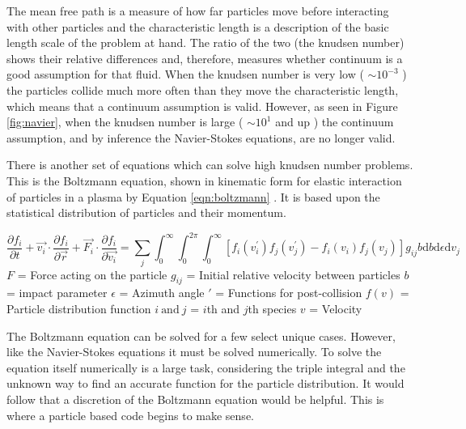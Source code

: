 \indent The mean free path is a measure of how far particles move before interacting with other particles and the characteristic length is a description of the basic length scale of the problem at hand. The ratio of the two (the knudsen number) shows their relative differences and, therefore, measures whether continuum is a good assumption for that fluid. When the knudsen number is very low ( \(\sim10^{-3}\) ) the particles collide much more often than they move the characteristic length, which means that a continuum assumption is valid. However, as seen in Figure \ref{fig:navier}, when the knudsen number is large ( \(\sim10^{1}\) and up ) the continuum assumption, and by inference the Navier-Stokes equations, are no longer valid. \par 

\indent There is another set of equations which can solve high knudsen number problems. This is the Boltzmann equation, shown in kinematic form for elastic interaction of particles in a plasma by Equation \ref{eqn:boltzmann} \cite{boltzmann}. It is based upon the statistical distribution of particles and their momentum. \par

\begin{equation}
    \label{eqn:boltzmann}
    \frac{\partial f_i}{\partial t} + \vec{v_i} \cdot \frac{\partial f_i}{\partial \vec{r}} + \vec{F_i} \cdot \frac{\partial f_i}{\partial \vec{v_i}} = \sum_j \int_0^\infty \int_0^{2\pi} \int_0^\infty  [ f_i(v_i^\prime) f_j (v_j^\prime) - f_i (v_i) f_j (v_j) ] g_{ij} b \text{d} b \text{d} \epsilon \text{d} v_j
\end{equation}
\(F\) = Force acting on the particle \newline
\(g_{ij}\) = Initial relative velocity between particles \newline
\(b\) = impact parameter \newline
\(\epsilon\) = Azimuth angle \newline
\(\prime\) = Functions for post-collision \newline
\(f(v)\) = Particle distribution function \newline
\(i \: \text{and} \: j\) =  \(i\)th and \(j\)th species \newline
\(v\)   = Velocity  \par

\indent The Boltzmann equation can be solved for a few select unique cases. However, like the Navier-Stokes equations it must be solved numerically. To solve the equation itself numerically is a large task, considering the triple integral and the unknown way to find an accurate function for the particle distribution. It would follow that a discretion of the Boltzmann equation would be helpful. This is where a particle based code begins to make sense. \par

